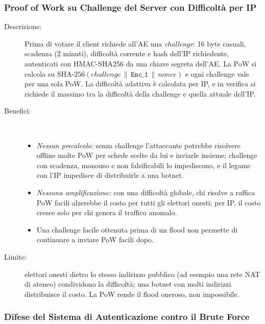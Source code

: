 \documentclass[12pt,a4paper]{article}
\begin{document}
\subsubsection{Proof of Work su Challenge del Server con Difficoltà per IP}
\label{sec:mod38}

\begin{description}
  \item[Descrizione:] Prima di votare il client richiede all'AE una \emph{challenge}: 16 byte casuali, scadenza (2 minuti), difficoltà corrente e hash dell'IP richiedente, autenticati con HMAC-SHA256 da una chiave segreta dell'AE. La PoW si calcola su $\mathrm{SHA\text{-}256}(\mathit{challenge} \,\|\, \mathtt{Enc\_1} \,\|\, \mathit{nonce})$ e ogni challenge vale per una sola PoW. La difficoltà adattiva è calcolata per IP, e in verifica si richiede il massimo tra la difficoltà della challenge e quella attuale dell'IP.
  \item[Benefici:] \
    \begin{itemize}
      \item \textit{Nessun precalcolo:} senza challenge l'attaccante potrebbe risolvere offline molte PoW per schede scelte da lui e inviarle insieme; challenge con scadenza, monouso e non falsificabili lo impediscono, e il legame con l'IP impedisce di distribuirle a una botnet.
      \item \textit{Nessuna amplificazione:} con una difficoltà globale, chi risolve a raffica PoW facili alzerebbe il costo per tutti gli elettori onesti; per IP, il costo cresce solo per chi genera il traffico anomalo.
      \item Una challenge facile ottenuta prima di un flood non permette di continuare a inviare PoW facili dopo.
    \end{itemize}
  \item[Limite:] elettori onesti dietro lo stesso indirizzo pubblico (ad esempio una rete NAT di ateneo) condividono la difficoltà; una botnet con molti indirizzi distribuisce il costo. La PoW rende il flood oneroso, non impossibile.
\end{description}

\subsubsection{Difese del Sistema di Autenticazione contro il Brute Force}
\label{sec:mod39}
\end{document}
